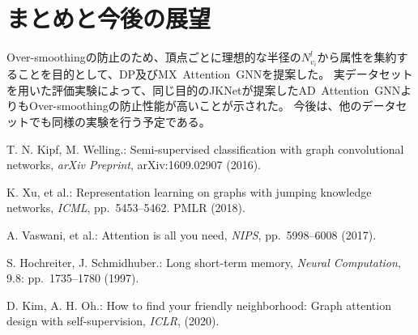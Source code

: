 \documentclass[a4j,twocolumn]{jsarticle}
\begin{document}
\section{まとめと今後の展望}

\vspace{-2mm}
Over-smoothingの防止のため、頂点ごとに理想的な半径の$N_{v_i}^l$から属性を集約することを目的として、DP及びMX~Attention~GNNを提案した。
実データセットを用いた評価実験によって、同じ目的のJKNetが提案したAD~Attention~GNNよりもOver-smoothingの防止性能が高いことが示された。
今後は、他のデータセットでも同様の実験を行う予定である。



\renewcommand{\bibname}{参考文献}
\begin{thebibliography}{1}
\vspace{-2mm}

T. N. Kipf, M. Welling.:
Semi-supervised classification with graph convolutional networks,
{\it arXiv Preprint}, arXiv:1609.02907 (2016).
\vspace{-0.3mm}

K. Xu, et al.:
Representation learning on graphs with jumping knowledge networks,
{\it ICML}, pp.~5453--5462. PMLR (2018).
\vspace{-0.3mm}

A. Vaswani, et al.:
Attention is all you need,
{\it NIPS}, pp.~5998--6008 (2017).
\vspace{-0.3mm}

S. Hochreiter, J. Schmidhuber.:
Long short-term memory,
{\it Neural Computation}, 9.8: pp.~1735--1780 (1997).
\vspace{-0.3mm}

D. Kim, A. H. Oh.:
How to find your friendly neighborhood: Graph attention design with self-supervision,
{\it ICLR}, (2020).
\vspace{-0.3mm}

\end{thebibliography}
\end{document}
